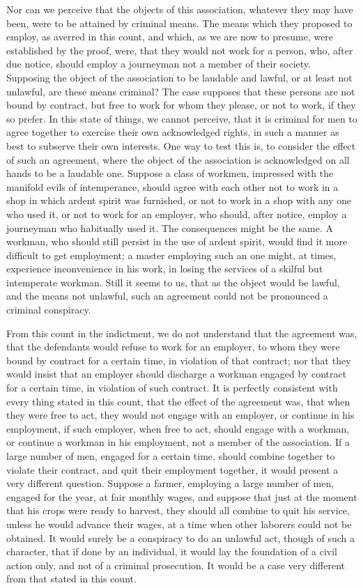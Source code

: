 \documentclass[
  letterpaper,
  11pt,
  DIV=9,
  openright]{scrbook}
\begin{document}
Nor can we perceive that the objects of this association, whatever they
may have been, were to be attained by criminal means. The means which
they proposed to employ, as averred in this count, and which, as we are
now to presume, were established by the proof, were, that they would not
work for a person, who, after due notice, should employ a journeyman not
a member of their society. Supposing the object of the association to be
laudable and lawful, or at least not unlawful, are these means criminal?
The case supposes that these persons are not bound by contract, but free
to work for whom they please, or not to work, if they so prefer. In this
state of things, we cannot perceive, that it is criminal for men to
agree together to exercise their own acknowledged rights, in such a
manner as best to subserve their own interests. One way to test this is,
to consider the effect of such an agreement, where the object of the
association is acknowledged on all hands to be a laudable one. Suppose a
class of workmen, impressed with the manifold evils of intemperance,
should agree with each other not to work in a shop in which ardent
spirit was furnished, or not to work in a shop with any one who used it,
or not to work for an employer, who should, after notice, employ a
journeyman who habitually used it. The consequences might be the same. A
workman, who should still persist in the use of ardent spirit, would
find it more difficult to get employment; a master employing such an one
might, at times, experience inconvenience in his work, in losing the
services of a skilful but intemperate workman. Still it seems to us,
that as the object would be lawful, and the means not unlawful, such an
agreement could not be pronounced a criminal conspiracy.

From this count in the indictment, we do not understand that the
agreement was, that the defendants would refuse to work for an employer,
to whom they were bound by contract for a certain time, in violation of
that contract; nor that they would insist that an employer should
discharge a workman engaged by contract for a certain time, in violation
of such contract. It is perfectly consistent with every thing stated in
this count, that the effect of the agreement was, that when they were
free to act, they would not engage with an employer, or continue in his
employment, if such employer, when free to act, should engage with a
workman, or continue a workman in his employment, not a member of the
association. If a large number of men, engaged for a certain time,
should combine together to violate their contract, and quit their
employment together, it would present a very different question. Suppose
a farmer, employing a large number of men, engaged for the year, at fair
monthly wages, and suppose that just at the moment that his crops were
ready to harvest, they should all combine to quit his service, unless he
would advance their wages, at a time when other laborers could not be
obtained. It would surely be a conspiracy to do an unlawful act, though
of such a character, that if done by an individual, it would lay the
foundation of a civil action only, and not of a criminal prosecution. It
would be a case very different from that stated in this count.
\end{document}
